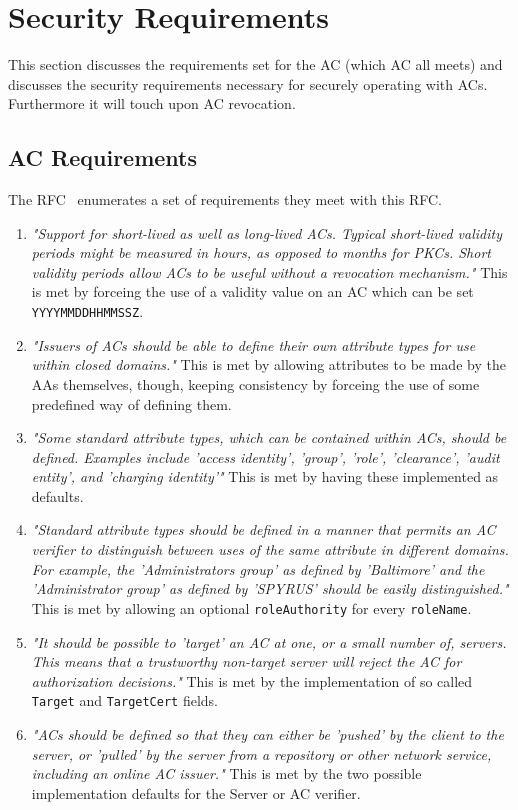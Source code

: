\documentclass[10pt,conference,a4paper]{IEEEtran}
\begin{document}
\section{Security Requirements}
\label{security_requirements}
This section discusses the requirements set for the AC (which AC all meets) and discusses the security requirements necessary for securely operating with ACs. Furthermore it will touch upon AC revocation.

\subsection{AC Requirements}
The RFC~\cite{rfc_ac} enumerates a set of requirements they meet with this RFC.
\begin{enumerate}
	\item \textit{"Support for short-lived as well as long-lived ACs. Typical short-lived validity periods might be measured in hours, as opposed to months for PKCs. Short validity periods allow ACs to be useful without a revocation mechanism."} This is met by forceing the use of a validity value on an AC which can be set \texttt{YYYYMMDDHHMMSSZ}.
	\item \textit{"Issuers of ACs should be able to define their own attribute types for use within closed domains."} This is met by allowing attributes to be made by the AAs themselves, though, keeping consistency by forceing the use of some predefined way of defining them.
	\item \textit{"Some standard attribute types, which can be contained within ACs, should be defined. Examples include 'access identity', 'group', 'role', 'clearance', 'audit entity', and 'charging identity'"} This is met by having these implemented as defaults.
	\item \textit{"Standard attribute types should be defined in a manner that permits an AC verifier to distinguish between uses of the same attribute in different domains. For example, the 'Administrators group' as defined by 'Baltimore' and the 'Administrator group' as defined by 'SPYRUS' should be easily distinguished."} This is met by allowing an optional \texttt{roleAuthority} for every \texttt{roleName}.
	\item \textit{"It should be possible to 'target' an AC at one, or a small number of, servers. This means that a trustworthy non-target server will reject the AC for authorization decisions."} This is met by the implementation of so called \texttt{Target} and \texttt{TargetCert} fields.
	\item \textit{"ACs should be defined so that they can either be 'pushed' by the client to the server, or 'pulled' by the server from a repository or other network service, including an online AC issuer."} This is met by the two possible implementation defaults for the Server or AC verifier.
\end{enumerate}
\end{document}
